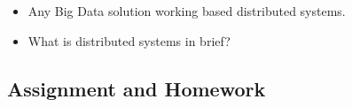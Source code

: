 
\begin{frame}
  \frametitle{\subsecname}
	\begin{itemize}[<+->]
		\item Any Big Data solution working based distributed systems.
		\item What is distributed systems in brief?
	\end{itemize}
\end{frame}

\subsection{Assignment and Homework}